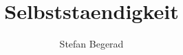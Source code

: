 

\usepackage{hyperref}

\usepackage{colortbl}

\usepackage{listings}

\title[selbststaendig]{Selbststaendigkeit}
\author{Stefan Begerad}
